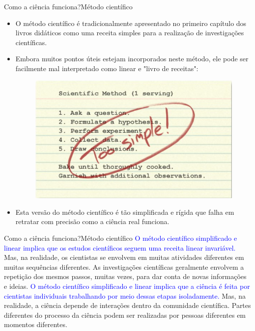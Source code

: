 \documentclass[t]{beamer}
\begin{document}

\begin{ftst}{Como a ciência funciona?}{Método científico}
\justifying
\small
\begin{itemize}
    \item O método científico é tradicionalmente apresentado no primeiro capítulo dos livros didáticos como uma receita simples para a realização de investigações científicas. 
    \item Embora muitos pontos úteis estejam incorporados neste método, ele pode ser facilmente mal interpretado como linear e "livro de receitas":
\begin{figure}
    \centering
    \includegraphics[scale=0.4]{Figuras/receitas.jpg}
\end{figure}
    \item Esta versão do método científico é tão simplificada e rígida que falha em retratar com precisão como a ciência real funciona.
\end{itemize}
\end{ftst}


\begin{ftst}{Como a ciência funciona?}{Método científico}
\justifying
\small
\textcolor{blue}{O método científico simplificado e linear implica que os estudos científicos seguem uma receita linear invariável.}
\vone
Mas, na realidade, os cientistas se envolvem em muitas atividades diferentes em muitas sequências diferentes. As investigações científicas geralmente envolvem a repetição dos mesmos passos, muitas vezes, para dar conta de novas informações e ideias.
\vone
\vone
\textcolor{blue}{O método científico simplificado e linear implica que a ciência é feita por cientistas individuais trabalhando por meio dessas etapas isoladamente.}
\vone
Mas, na realidade, a ciência depende de interações dentro da comunidade científica. Partes diferentes do processo da ciência podem ser realizadas por pessoas diferentes em momentos diferentes.

\end{ftst}
\end{document}
